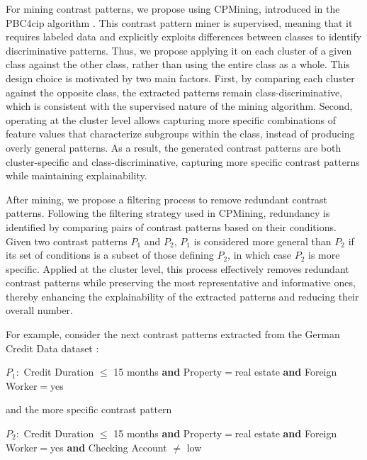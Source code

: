 {       	For mining contrast patterns, we propose using CPMining, introduced in the PBC4cip algorithm \cite{loyola2017pbc4cip}. This contrast pattern miner is supervised, meaning that it requires labeled data and explicitly exploits differences between classes to identify discriminative patterns. Thus, we propose applying it on each cluster of a given class against the other class, rather than using the entire class as a whole. This design choice is motivated by two main factors. First, by comparing each cluster against the opposite class, the extracted patterns remain class-discriminative, which is consistent with the supervised nature of the mining algorithm. Second, operating at the cluster level allows capturing more specific combinations of feature values that characterize subgroups within the class, instead of producing overly general patterns. As a result, the generated contrast patterns are both cluster-specific and class-discriminative, capturing more specific contrast patterns while maintaining explainability.\newline
       
       	After mining, we propose a filtering process to remove redundant contrast patterns. Following the filtering strategy used in CPMining, redundancy is identified by comparing pairs of contrast patterns based on their conditions. Given two contrast patterns $P_{1}$ and $P_{2}$, $P_{1}$ is considered more general than $P_{2}$ if its set of conditions is a subset of those defining $P_{2}$, in which case $P_{2}$ is more specific. Applied at the cluster level, this process effectively removes redundant contrast patterns while preserving the most representative and informative ones, thereby enhancing the explainability of the extracted patterns and reducing their overall number.\newline
       
       	For example, consider the next contrast patterns extracted from the German Credit Data dataset \cite{statlog_german_credit_data_144}:\newline
       
       	$P_{1}:$ Credit Duration $\leq$ 15 months \textbf{and} Property$=$real estate \textbf{and} Foreign Worker$=$yes\newline
       
       	and the more specific contrast pattern\newline
       
       	$P_{2}:$  Credit Duration $\leq$ 15 months \textbf{and} Property$=$real estate \textbf{and} Foreign Worker$=$yes \textbf{and} Checking Account $\neq$ low\newline
       
}
